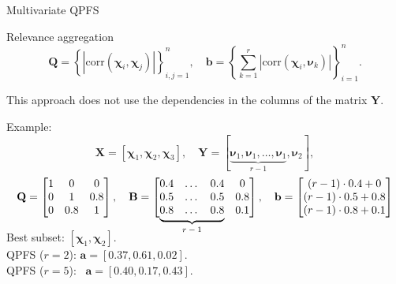 \documentclass[9pt]{beamer}
\newcommand{\ba}{\mathbf{a}}
\newcommand{\bb}{\mathbf{b}}
\newcommand{\bY}{\mathbf{Y}}
\newcommand{\bX}{\mathbf{X}}
\newcommand{\bB}{\mathbf{B}}
\newcommand{\bQ}{\mathbf{Q}}
\newcommand{\bchi}{\boldsymbol{\chi}}
\newcommand{\bnu}{\boldsymbol{\nu}}
\newcommand\undermat[2]{%
	\makebox[0pt][l]{$\smash{\underbrace{\phantom{%
					\begin{matrix}#2\end{matrix}}}_{\text{$#1$}}}$}#2}
\begin{document}
\begin{frame}{Multivariate QPFS}
\begin{block}{Relevance aggregation}
\vspace{-0.3cm}
\[
\bQ = \left\{\left|\text{corr}(\bchi_i, \bchi_j)\right|\right\}_{i,j=1}^n, \quad \bb = \left\{\sum_{k=1}^r\left|\text{corr}(\bchi_i, \bnu_k)\right|\right\}_{i=1}^n.
\]
\vspace{-0.3cm}
\end{block}

This approach does not use the dependencies in the columns of the matrix $\bY$. 
	
\begin{block}{Example:}
\vspace{-0.5cm}
\[
\bX = [\bchi_1, \bchi_2, \bchi_3], \quad \bY = [\underbrace{\bnu_1, \bnu_1, \dots, \bnu_1}_{r-1}, \bnu_2],
\]
\vspace{-0.2cm}
\[
\bQ = \begin{bmatrix} 1 & 0 & 0\\ 0 & 1 & 0.8 \\ 0 & 0.8 & 1 \end{bmatrix}, \quad 
\bB = \begin{bmatrix} 0.4 & \dots & 0.4 & 0 \\ 0.5 & \dots & 0.5 & 0.8 \\ \undermat{r-1}{0.8 & \dots & 0.8} & 0.1 \end{bmatrix}, \quad
\bb = \begin{bmatrix} (r-1) \cdot 0.4 + 0 \\ (r-1) \cdot 0.5 + 0.8 \\ (r-1) \cdot 0.8 + 0.1 \end{bmatrix}
\]
\end{block}
\vspace{0.2cm}

Best subset: $[\bchi_1, \bchi_2]$. \\
\vspace{0.2cm}
QPFS ($r=2$): $\ba = [\mathbf{0.37},	\mathbf{0.61},	0.02]$. \\
QPFS ($r=5$): ~$\ba = [\mathbf{0.40},	0.17, \mathbf{0.43}]$. 
\end{frame}
\end{document}
